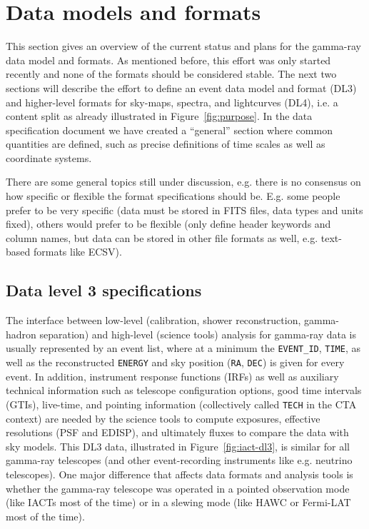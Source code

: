 \section{Data models and formats}

This section gives an overview of the current status and plans for the gamma-ray data model and formats. As mentioned before, this effort was only started recently and none of the formats should be considered stable. The next two sections will describe the effort to define an event data model and format (DL3) and higher-level formats for sky-maps, spectra, and lightcurves (DL4), i.e. a content split as already illustrated in Figure~\ref{fig:purpose}.
In the data specification document we have created a ``general'' section where common quantities are defined, such as precise definitions of time scales as well as coordinate systems. 

There are some general topics still under discussion, e.g. there is no consensus on how specific or flexible the format specifications should be. E.g. some people prefer to be very specific (data must be stored in FITS files, data types and units fixed), others would prefer to be flexible (only define header keywords and column names, but data can be stored in other file formats as well, e.g. text-based formats like ECSV).

\subsection{Data level 3 specifications}

The interface between low-level (calibration, shower reconstruction, gamma-hadron separation) and high-level (science tools) analysis for gamma-ray data is usually represented by an event list, where at a minimum the \texttt{EVENT\_ID}, \texttt{TIME}, as well as the reconstructed \texttt{ENERGY} and sky position (\texttt{RA}, \texttt{DEC}) is given for every event. In addition, instrument response functions (IRFs) as well as auxiliary technical information such as telescope configuration options, good time intervals (GTIs), live-time, and pointing information (collectively called \texttt{TECH} in the CTA context) are needed by the science tools to compute exposures, effective resolutions (PSF and EDISP), and ultimately fluxes to compare the data with sky models. This DL3 data, illustrated in Figure~\ref{fig:iact-dl3}, is similar for all gamma-ray telescopes (and other event-recording instruments like e.g. neutrino telescopes). One major difference that affects data formats and analysis tools is whether the gamma-ray telescope was operated in a pointed observation mode (like IACTs most of the time) or in a slewing mode (like HAWC or Fermi-LAT most of the time).

